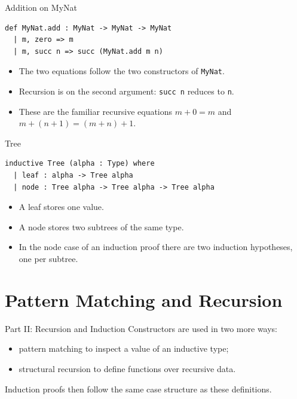 ﻿\documentclass[aspectratio=169,11pt]{beamer}
\newcommand{\DTwoPartName}{Overview}
\newcommand{\setDTwoPart}[1]{\gdef\DTwoPartName{#1}}
\begin{document}
\begin{frame}[fragile]{Addition on MyNat}
  \begin{lstlisting}
def MyNat.add : MyNat -> MyNat -> MyNat
  | m, zero => m
  | m, succ n => succ (MyNat.add m n)
  \end{lstlisting}

  \begin{itemize}
    \item The two equations follow the two constructors of \texttt{MyNat}.
    \item Recursion is on the second argument: \texttt{succ n} reduces to \texttt{n}.
    \item These are the familiar recursive equations \(m + 0 = m\) and \(m + (n+1) = (m+n)+1\).
  \end{itemize}
\end{frame}

\begin{frame}[fragile]{Tree}
  \begin{lstlisting}
inductive Tree (alpha : Type) where
  | leaf : alpha -> Tree alpha
  | node : Tree alpha -> Tree alpha -> Tree alpha
  \end{lstlisting}

  \begin{itemize}
    \item A leaf stores one value.
    \item A node stores two subtrees of the same type.
    \item In the node case of an induction proof there are two induction hypotheses, one per subtree.
  \end{itemize}
\end{frame}

\setDTwoPart{Part II: Recursion and Induction}
\section{Pattern Matching and Recursion}

\begin{frame}{Part II: Recursion and Induction}
  \hypertarget{part-recursion-induction}{}
  Constructors are used in two more ways:

  \begin{itemize}
    \item pattern matching to inspect a value of an inductive type;
    \item structural recursion to define functions over recursive data.
  \end{itemize}

  Induction proofs then follow the same case structure as these definitions.
\end{frame}
\end{document}
